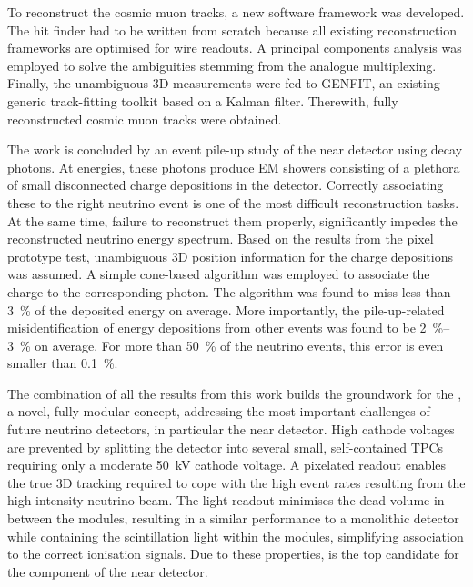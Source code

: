 To reconstruct the cosmic muon tracks, a new software framework was developed.
The hit finder had to be written from scratch because all existing \lartpc{} reconstruction frameworks are optimised for wire readouts.
A principal components analysis was employed to solve the ambiguities stemming from the analogue multiplexing.
Finally, the unambiguous 3D measurements were fed to GENFIT, an existing generic track-fitting toolkit based on a Kalman filter.
Therewith, fully reconstructed cosmic muon tracks were obtained.

The work is concluded by an event pile-up study of the \dune{} near detector using \Pgpz decay photons.
At \dune{} energies, these photons produce EM showers consisting of a plethora of small disconnected charge depositions in the detector.
Correctly associating these to the right neutrino event is one of the most difficult reconstruction tasks.
At the same time, failure to reconstruct them properly, significantly impedes the reconstructed neutrino energy spectrum.
Based on the results from the pixel prototype test, unambiguous 3D position information for the charge depositions was assumed.
A simple cone-based algorithm was employed to associate the charge to the corresponding photon.
The algorithm was found to miss less than \SI{3}{\percent} of the deposited energy on average.
More importantly, the pile-up-related misidentification of energy depositions from other events was found to be \SIrange{2}{3}{\percent} on average.
For more than \SI{50}{\percent} of the neutrino events, this error is even smaller than \SI{0.1}{\percent}.

The combination of all the results from this work builds the groundwork for the \AC{}, a novel, fully modular \lartpc{} concept, addressing the most important challenges of future neutrino detectors, in particular the \dune{} near detector.
High cathode voltages are prevented by splitting the detector into several small, self-contained TPCs requiring only a moderate \SI{50}{\kilo\volt} cathode voltage.
A pixelated readout enables the true 3D tracking required to cope with the high event rates resulting from the high-intensity neutrino beam.
The \AL{} light readout minimises the dead volume in between the modules, resulting in a similar performance to a monolithic detector while containing the scintillation light within the modules, simplifying association to the correct ionisation signals.
Due to these properties, \AC{} is the top candidate for the \lar{} component of the \dune{} near detector.
